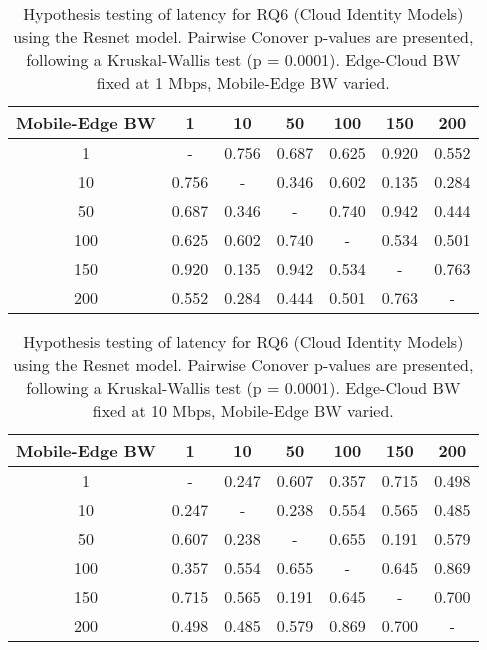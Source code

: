 \begin{table}[H]
\caption{Hypothesis testing of latency for RQ6 (Cloud Identity Models) using the Resnet model. Pairwise Conover p-values are presented, following a Kruskal-Wallis test (p = 0.0001). Edge-Cloud BW fixed at 1 Mbps, Mobile-Edge BW varied.}
\centering
\begin{tabular}{c|cccccc}
Mobile-Edge BW & 1 & 10 & 50 & 100 & 150 & 200 \\
\hline
1 & - & 0.756 & 0.687 & 0.625 & 0.920 & 0.552 \\
10 & 0.756 & - & 0.346 & 0.602 & 0.135 & 0.284 \\
50 & 0.687 & 0.346 & - & 0.740 & 0.942 & 0.444 \\
100 & 0.625 & 0.602 & 0.740 & - & 0.534 & 0.501 \\
150 & 0.920 & 0.135 & 0.942 & 0.534 & - & 0.763 \\
200 & 0.552 & 0.284 & 0.444 & 0.501 & 0.763 & - \\
\end{tabular}
\end{table}

\begin{table}[H]
\caption{Hypothesis testing of latency for RQ6 (Cloud Identity Models) using the Resnet model. Pairwise Conover p-values are presented, following a Kruskal-Wallis test (p = 0.0001). Edge-Cloud BW fixed at 10 Mbps, Mobile-Edge BW varied.}
\centering
\begin{tabular}{c|cccccc}
Mobile-Edge BW & 1 & 10 & 50 & 100 & 150 & 200 \\
\hline
1 & - & 0.247 & 0.607 & 0.357 & 0.715 & 0.498 \\
10 & 0.247 & - & 0.238 & 0.554 & 0.565 & 0.485 \\
50 & 0.607 & 0.238 & - & 0.655 & 0.191 & 0.579 \\
100 & 0.357 & 0.554 & 0.655 & - & 0.645 & 0.869 \\
150 & 0.715 & 0.565 & 0.191 & 0.645 & - & 0.700 \\
200 & 0.498 & 0.485 & 0.579 & 0.869 & 0.700 & - \\
\end{tabular}
\end{table}

